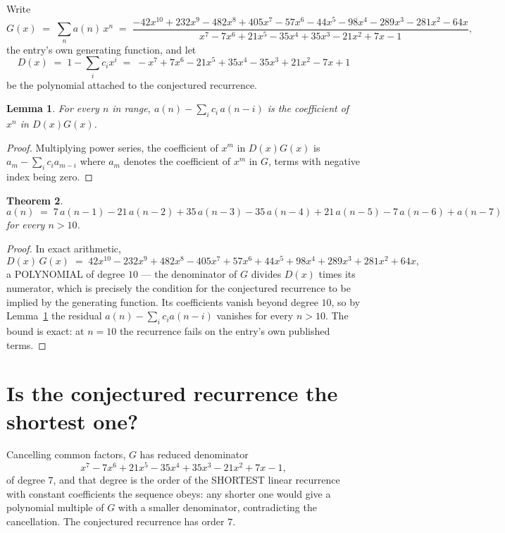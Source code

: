 \documentclass[11pt,a4paper]{article}
\theoremstyle{plain}
\newtheorem{theorem}{Theorem}
\newtheorem{lemma}[theorem]{Lemma}
\theoremstyle{definition}
\begin{document}
Write
\[
G(x)\;=\;\sum_{n}a(n)\,x^{n}\;=\;\frac{- 42 x^{10} + 232 x^{9} - 482 x^{8} + 405 x^{7} - 57 x^{6} - 44 x^{5} - 98 x^{4} - 289 x^{3} - 281 x^{2} - 64 x}{x^{7} - 7 x^{6} + 21 x^{5} - 35 x^{4} + 35 x^{3} - 21 x^{2} + 7 x - 1},
\]
the entry's own generating function, and let
\[
D(x)\;=\;1-\sum_i c_i x^{i}\;=\;- x^{7} + 7 x^{6} - 21 x^{5} + 35 x^{4} - 35 x^{3} + 21 x^{2} - 7 x + 1
\]
be the polynomial attached to the conjectured recurrence.

\begin{lemma}\label{lem:key}
For every $n$ in range, $a(n)-\sum_i c_i\,a(n-i)$ is the coefficient of $x^{n}$ in
$D(x)G(x)$.
\end{lemma}

\begin{proof}
Multiplying power series, the coefficient of $x^{m}$ in $D(x)G(x)$ is
$a_m-\sum_i c_i a_{m-i}$ where $a_m$ denotes the coefficient of $x^{m}$ in $G$, terms with
negative index being zero.
\end{proof}

\begin{theorem}
\[
a(n)\;=\;7\,a(n-1) - 21\,a(n-2) + 35\,a(n-3) - 35\,a(n-4) + 21\,a(n-5) - 7\,a(n-6) + a(n-7)
\]
for every $n>10$.
\end{theorem}

\begin{proof}
In exact arithmetic,
\[
D(x)\,G(x)\;=\;42 x^{10} - 232 x^{9} + 482 x^{8} - 405 x^{7} + 57 x^{6} + 44 x^{5} + 98 x^{4} + 289 x^{3} + 281 x^{2} + 64 x,
\]
a POLYNOMIAL of degree $10$ --- the denominator of $G$ divides $D(x)$ times its numerator,
which is precisely the condition for the conjectured recurrence to be implied by the
generating function. Its coefficients vanish beyond degree $10$, so by
Lemma~\ref{lem:key} the residual $a(n)-\sum_ic_ia(n-i)$ vanishes for every
$n>10$. The bound is exact: at $n=10$ the recurrence fails on the entry's own published terms.
\end{proof}

\section{Is the conjectured recurrence the shortest one?}

Cancelling common factors, $G$ has reduced denominator
\[
x^{7} - 7 x^{6} + 21 x^{5} - 35 x^{4} + 35 x^{3} - 21 x^{2} + 7 x - 1,
\]
of degree $7$, and that degree is the order of the SHORTEST linear recurrence with
constant coefficients the sequence obeys: any shorter one would give a polynomial multiple of
$G$ with a smaller denominator, contradicting the cancellation. The conjectured recurrence has
order $7$.
\end{document}

